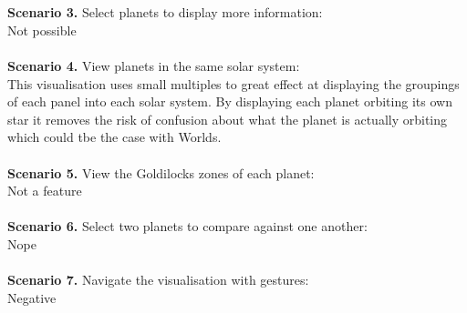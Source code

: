 \\\\
{\bf Scenario 3.} Select planets to display more information:\\
Not possible
\\\\
{\bf Scenario 4.} View planets in the same solar system:\\
This visualisation uses small multiples to great effect at displaying the groupings of each panel into each solar system. By displaying each planet orbiting its own star it removes the risk of confusion about what the planet is actually orbiting which could tbe the case with Worlds.
\\\\
{\bf Scenario 5.} View the Goldilocks zones of each planet:\\
Not a feature
\\\\
{\bf Scenario 6.} Select two planets to compare against one another:\\
Nope
\\\\
{\bf Scenario 7.} Navigate the visualisation with gestures: \\
Negative
\\\\

